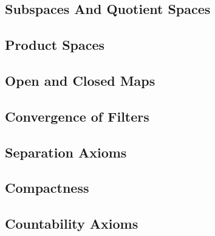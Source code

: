 \subsection{Subspaces And Quotient Spaces}


\subsection{Product Spaces}

\subsection{Open and Closed Maps}
\subsection{Convergence of Filters}













\subsection{Separation Axioms}


\subsection{Compactness}
\subsection{Countability  Axioms}








